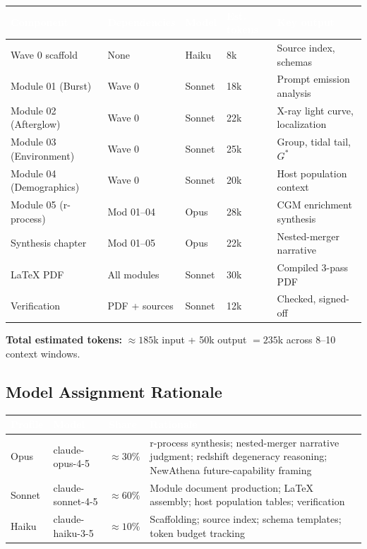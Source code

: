 \documentclass[11pt,letterpaper]{article}
\newcommand{\tableheader}[1]{\textbf{\sffamily\textcolor{white}{#1}}}
\begin{document}
\begin{center}
\begin{tabularx}{\textwidth}{L{3cm}L{2.5cm}C{1.8cm}C{2cm}X}
\toprule
{}
\tableheader{Component} & \tableheader{Dependencies} & \tableheader{Model} & \tableheader{Est. tokens} & \tableheader{Key output} \\
\midrule
Wave 0 scaffold & None & Haiku & 8k & Source index, schemas \\
Module 01 (Burst) & Wave 0 & Sonnet & 18k & Prompt emission analysis \\
Module 02 (Afterglow) & Wave 0 & Sonnet & 22k & X-ray light curve, localization \\
Module 03 (Environment) & Wave 0 & Sonnet & 25k & Group, tidal tail, $G^*$ \\
Module 04 (Demographics) & Wave 0 & Sonnet & 20k & Host population context \\
Module 05 (r-process) & Mod 01--04 & Opus & 28k & CGM enrichment synthesis \\
Synthesis chapter & Mod 01--05 & Opus & 22k & Nested-merger narrative \\
LaTeX PDF & All modules & Sonnet & 30k & Compiled 3-pass PDF \\
Verification & PDF + sources & Sonnet & 12k & Checked, signed-off \\
\bottomrule
\end{tabularx}
\end{center}

\textbf{Total estimated tokens:} $\approx 185$k input + 50k output $= 235$k across 8--10 context windows.

\subsection{Model Assignment Rationale}

\begin{center}
\begin{tabularx}{\textwidth}{C{1.8cm}C{2cm}C{2.5cm}X}
\toprule
{}
\tableheader{Profile} & \tableheader{Model} & \tableheader{Share} & \tableheader{Rationale} \\
\midrule
Opus & claude-opus-4-5 & $\approx 30\%$ & r-process synthesis; nested-merger narrative judgment; redshift degeneracy reasoning; NewAthena future-capability framing \\
Sonnet & claude-sonnet-4-5 & $\approx 60\%$ & Module document production; LaTeX assembly; host population tables; verification \\
Haiku & claude-haiku-3-5 & $\approx 10\%$ & Scaffolding; source index; schema templates; token budget tracking \\
\bottomrule
\end{tabularx}
\end{center}
\end{document}

